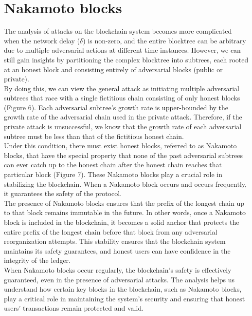 \section{Nakamoto blocks}
The analysis of attacks on the blockchain system becomes more complicated when the network delay ($\delta$) is non-zero, and the entire blocktree can be arbitrary due to multiple adversarial actions at different time instances. However, we can still gain insights by partitioning the complex blocktree into subtrees, each rooted at an honest block and consisting entirely of adversarial blocks (public or private).\\
By doing this, we can view the general attack as initiating multiple adversarial subtrees that race with a single fictitious chain consisting of only honest blocks (Figure 6). Each adversarial subtree's growth rate is upper-bounded by the growth rate of the adversarial chain used in the private attack. Therefore, if the private attack is unsuccessful, we know that the growth rate of each adversarial subtree must be less than that of the fictitious honest chain.\\
Under this condition, there must exist honest blocks, referred to as Nakamoto blocks, that have the special property that none of the past adversarial subtrees can ever catch up to the honest chain after the honest chain reaches that particular block (Figure 7). These Nakamoto blocks play a crucial role in stabilizing the blockchain. When a Nakamoto block occurs and occurs frequently, it guarantees the safety of the protocol.\\
The presence of Nakamoto blocks ensures that the prefix of the longest chain up to that block remains immutable in the future. In other words, once a Nakamoto block is included in the blockchain, it becomes a solid anchor that protects the entire prefix of the longest chain before that block from any adversarial reorganization attempts. This stability ensures that the blockchain system maintains its safety guarantees, and honest users can have confidence in the integrity of the ledger.\\
When Nakamoto blocks occur regularly, the blockchain's safety is effectively guaranteed, even in the presence of adversarial attacks. The analysis helps us understand how certain key blocks in the blockchain, such as Nakamoto blocks, play a critical role in maintaining the system's security and ensuring that honest users' transactions remain protected and valid.

